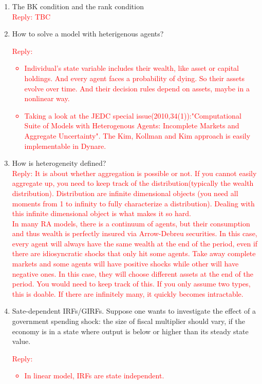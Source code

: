 \documentclass[10pt,math=newtx,citestyle=gb7714-2015,bibstyle=gb7714-2015]{elegantbook}
\begin{document}
{{{\begin{enumerate}
		\item The BK condition and the rank condition\\
		\textcolor{red}{Reply: TBC}
		\item How to solve a model with heterigenous agents?\\
		\textcolor{red}{Reply:
			\begin{itemize}
				\item Individual's state variable includes their wealth, like asset or capital holdings. And every agent faces a probability of dying. So their assets evolve over time. And their decision rules depend on assets, maybe in a nonlinear way.
				\item Taking a look at the JEDC special issue(2010,34(1)):"Computational Suite of Models with Heterogenous Agents: Incomplete Markets and Aggregate Uncertainty". The Kim, Kollman and Kim approach is easily implementable in Dynare.
			\end{itemize}
		}
		\item How is heterogeneity defined?\\
		\textcolor{red}{Reply: It is about whether aggregation is possible or not. If you cannot easily aggregate up, you need to keep track of the distribution(typically the wealth distribution). Distribution are infinite dimensional objects (you need all moments from 1 to infinity to fully characterize a distribution). Dealing with this infinite dimensional object is what makes it so hard.\\
			In many RA models, there is a continuum of agents, but their consumption and thus wealth is perfectly insured via Arrow-Debreu securities. In this case, every agent will always have the same wealth at the end of the period, even if there are idiosyncratic shocks that only hit some agents. Take away complete markets and some agents will have positive shocks while other will have negative ones. In this case, they will choose different assets at the end of the period. You would need to keep track of this. If you only assume two types, this is doable. If there are infinitely many, it quickly becomes intractable.}
		\item Sate-dependent IRFs/GIRFs. Suppose one wants to investigate the effect of a government spending shock: the size of fiscal multiplier should vary, if the economy is in a state where output is below or higher than its steady state value.\\
		\textcolor{red}{Reply:
			\begin{itemize}
				\item In linear model, IRFs are state independent.

\end{itemize}}
\end{enumerate}}}}
\end{document}
